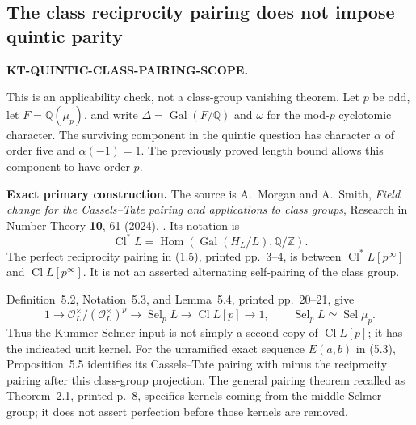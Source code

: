 \documentclass[11pt,a4paper]{article}
\theoremstyle{definition}
\renewcommand{\paragraph}[1]{\par\smallskip\noindent\textbf{#1}\quad\ignorespaces}
\begin{document}


\subsection{The class reciprocity pairing does not impose quintic parity}
\label{KT-QUINTIC-CLASS-PAIRING-SCOPE}
\noindent\textbf{KT-QUINTIC-CLASS-PAIRING-SCOPE.}\quad

This is an applicability check, not a class-group vanishing theorem.
Let $p$ be odd, let $F=\mathbb Q(\mu_p)$, and write
$\Delta=\operatorname{Gal}(F/\mathbb Q)$ and $\omega$ for the mod-$p$
cyclotomic character.  The surviving component in the quintic question has
character $\alpha$ of order five and $\alpha(-1)=1$.  The previously proved
length bound allows this component to have order $p$.

\paragraph{Exact primary construction.}
The source is A.~Morgan and A.~Smith, \emph{Field change for the
Cassels--Tate pairing and applications to class groups}, Research in
Number Theory \textbf{10}, 61 (2024),
.
Its notation is
\[
 \operatorname{Cl}^{*}L=
 \operatorname{Hom}(\operatorname{Gal}(H_L/L),\mathbb Q/\mathbb Z).
\]
The perfect reciprocity pairing in (1.5), printed pp.~3--4, is between
$\operatorname{Cl}^{*}L[p^\infty]$ and
$\operatorname{Cl}L[p^\infty]$.  It is not an asserted alternating
self-pairing of the class group.

Definition~5.2, Notation~5.3, and Lemma~5.4, printed pp.~20--21, give
\[
 1\longrightarrow\mathcal O_L^\times/(\mathcal O_L^\times)^p
 \longrightarrow\operatorname{Sel}_pL
 \longrightarrow\operatorname{Cl}L[p]\longrightarrow1,
 \qquad
 \operatorname{Sel}_pL\simeq\operatorname{Sel}\mu_p.
 \tag{CP.1}
\]
Thus the Kummer Selmer input is not simply a second copy of
$\operatorname{Cl}L[p]$; it has the indicated unit kernel.
For the unramified exact sequence $E(a,b)$ in (5.3), Proposition~5.5
identifies its Cassels--Tate pairing with minus the reciprocity pairing
after this class-group projection.  The general pairing theorem recalled
as Theorem~2.1, printed p.~8, specifies kernels coming from the middle
Selmer group; it does not assert perfection before those kernels are
removed.
\end{document}
